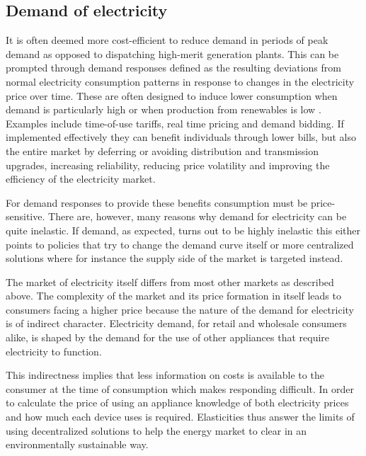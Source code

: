 \subsection{Demand of electricity}
\label{subsec:t_demand}
It is often deemed more cost-efficient to reduce demand in periods of peak demand as opposed to dispatching high-merit generation plants. This can be prompted through demand responses defined as the resulting deviations from normal electricity consumption patterns in response to changes in the electricity price over time. These are often designed to induce lower consumption when demand is particularly high or when production from renewables is low \citep{albadi2008summary}. Examples include time-of-use tariffs, real time pricing and demand bidding. If implemented effectively they can benefit individuals through lower bills, but also the entire market by deferring or avoiding distribution and transmission upgrades, increasing reliability, reducing price volatility and improving the efficiency of the electricity market.
\par
For demand responses to provide these benefits consumption must be price-sensitive. There are, however, many reasons why demand for electricity can be quite inelastic. If demand, as expected, turns out to be highly inelastic this either points to policies that try to change the demand curve itself or more centralized solutions where for instance the supply side of the market is targeted instead.
\bigskip \par
The market of electricity itself differs from most other markets as described above. The complexity of the market and its price formation in itself leads to consumers facing a higher price because the nature of the demand for electricity is of indirect character. Electricity demand, for retail and wholesale consumers alike, is shaped by the demand for the use of other appliances that require electricity to function.
\par
This indirectness implies that less information on costs is available to the consumer at the time of consumption which makes responding difficult. In order to calculate the price of using an appliance knowledge of both electricity prices and how much each device uses is required. Elasticities thus answer the limits of using decentralized solutions to help the energy market to clear in an environmentally sustainable way.
\bigskip \par
